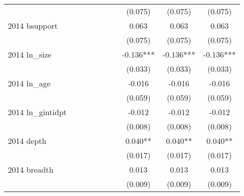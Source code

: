 \begin{table}[htbp]
\begin{tabular}{l*{9}{c}}
                    &               &               &               &               &               &               &     (0.075)   &     (0.075)   &     (0.075)   \\
2014 bsupport       &               &               &               &               &               &               &       0.063   &       0.063   &       0.063   \\
                    &               &               &               &               &               &               &     (0.075)   &     (0.075)   &     (0.075)   \\
2014 ln\_size        &               &               &               &               &               &               &      -0.136***&      -0.136***&      -0.136***\\
                    &               &               &               &               &               &               &     (0.033)   &     (0.033)   &     (0.033)   \\
2014 ln\_age         &               &               &               &               &               &               &      -0.016   &      -0.016   &      -0.016   \\
                    &               &               &               &               &               &               &     (0.059)   &     (0.059)   &     (0.059)   \\
2014 ln\_gintidpt    &               &               &               &               &               &               &      -0.012   &      -0.012   &      -0.012   \\
                    &               &               &               &               &               &               &     (0.008)   &     (0.008)   &     (0.008)   \\
2014 depth          &               &               &               &               &               &               &       0.040** &       0.040** &       0.040** \\
                    &               &               &               &               &               &               &     (0.017)   &     (0.017)   &     (0.017)   \\
2014 breadth        &               &               &               &               &               &               &       0.013   &       0.013   &       0.013   \\
                    &               &               &               &               &               &               &     (0.009)   &     (0.009)   &     (0.009)   \\

\end{tabular}
\end{table}
